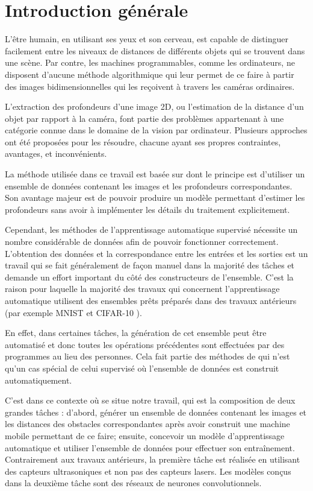 \chapter*{Introduction générale}

L'être humain, en utilisant ses yeux et son cerveau, est capable de distinguer facilement
entre les niveaux de distances de différents objets qui se trouvent dans une scène.
Par contre, les machines programmables, comme les ordinateurs, ne disposent d'aucune
méthode algorithmique qui leur permet de ce faire à partir des images bidimensionnelles
qui les reçoivent à travers les caméras ordinaires.

L'extraction des profondeurs d'une image 2D, ou l'estimation de la distance
d'un objet par rapport à la caméra, font partie des problèmes appartenant à une catégorie
connue dans le domaine de la vision par ordinateur. Plusieurs approches ont été
proposées pour les résoudre, chacune ayant ses propres contraintes, avantages, et
inconvénients.

La méthode utilisée dans ce travail est basée sur  dont le principe est d'utiliser un ensemble de données contenant les
images et les profondeurs correspondantes. Son avantage majeur est de pouvoir
produire un modèle permettant d'estimer les profondeurs sans avoir à implémenter
les détails du traitement explicitement.

Cependant, les méthodes de l'apprentissage automatique supervisé nécessite
un nombre considérable de données afin de pouvoir fonctionner correctement.
L'obtention des données et la correspondance entre les entrées et les sorties
est un travail qui se fait généralement de façon manuel dans la majorité des tâches
et demande un effort important du côté des constructeurs de l'ensemble. C'est la
raison pour laquelle la majorité des travaux qui concernent l'apprentissage automatique
utilisent des ensembles prêts préparés dans des travaux antérieurs (par exemple
MNIST \cite{lecun2010mnist} et CIFAR-10 \cite{krizhevsky2009learning}).

En effet, dans certaines tâches, la génération de cet ensemble peut être automatisé
et donc toutes les opérations précédentes sont effectuées par des programmes au lieu
des personnes. Cela fait partie des méthodes de  qui n'est qu'un cas spécial de celui supervisé où
l'ensemble de données est construit automatiquement.

C'est dans ce contexte où se situe notre travail, qui est la composition de deux
grandes tâches : d'abord, générer un ensemble de données contenant les images et les distances
des obstacles correspondantes après avoir construit une machine mobile permettant
de ce faire; ensuite, concevoir un modèle d'apprentissage automatique et utiliser
l'ensemble de données pour effectuer son entraînement. Contrairement aux travaux
antérieurs, la première tâche est réalisée en utilisant des capteurs ultrasoniques
et non pas des capteurs lasers. Les modèles conçus dans la deuxième tâche sont
des réseaux de neurones convolutionnels.

